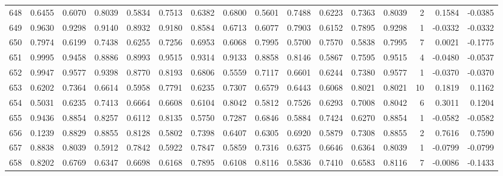\begin{tabular}{lrrrrrrrrrrrrrrr}
648 &      0.6455 &  0.6070 &  0.8039 &  0.5834 &  0.7513 &  0.6382 &  0.6800 &  0.5601 &  0.7488 &  0.6223 &   0.7363 &     0.8039 &      2 &                    0.1584 &                    -0.0385 \\
649 &      0.9630 &  0.9298 &  0.9140 &  0.8932 &  0.9180 &  0.8584 &  0.6713 &  0.6077 &  0.7903 &  0.6152 &   0.7895 &     0.9298 &      1 &                   -0.0332 &                    -0.0332 \\
650 &      0.7974 &  0.6199 &  0.7438 &  0.6255 &  0.7256 &  0.6953 &  0.6068 &  0.7995 &  0.5700 &  0.7570 &   0.5838 &     0.7995 &      7 &                    0.0021 &                    -0.1775 \\
651 &      0.9995 &  0.9458 &  0.8886 &  0.8993 &  0.9515 &  0.9314 &  0.9133 &  0.8858 &  0.8146 &  0.5867 &   0.7595 &     0.9515 &      4 &                   -0.0480 &                    -0.0537 \\
652 &      0.9947 &  0.9577 &  0.9398 &  0.8770 &  0.8193 &  0.6806 &  0.5559 &  0.7117 &  0.6601 &  0.6244 &   0.7380 &     0.9577 &      1 &                   -0.0370 &                    -0.0370 \\
653 &      0.6202 &  0.7364 &  0.6614 &  0.5958 &  0.7791 &  0.6235 &  0.7307 &  0.6579 &  0.6443 &  0.6068 &   0.8021 &     0.8021 &     10 &                    0.1819 &                     0.1162 \\
654 &      0.5031 &  0.6235 &  0.7413 &  0.6664 &  0.6608 &  0.6104 &  0.8042 &  0.5812 &  0.7526 &  0.6293 &   0.7008 &     0.8042 &      6 &                    0.3011 &                     0.1204 \\
655 &      0.9436 &  0.8854 &  0.8257 &  0.6112 &  0.8135 &  0.5750 &  0.7287 &  0.6846 &  0.5884 &  0.7424 &   0.6270 &     0.8854 &      1 &                   -0.0582 &                    -0.0582 \\
656 &      0.1239 &  0.8829 &  0.8855 &  0.8128 &  0.5802 &  0.7398 &  0.6407 &  0.6305 &  0.6920 &  0.5879 &   0.7308 &     0.8855 &      2 &                    0.7616 &                     0.7590 \\
657 &      0.8838 &  0.8039 &  0.5912 &  0.7842 &  0.5922 &  0.7847 &  0.5859 &  0.7316 &  0.6375 &  0.6646 &   0.6364 &     0.8039 &      1 &                   -0.0799 &                    -0.0799 \\
658 &      0.8202 &  0.6769 &  0.6347 &  0.6698 &  0.6168 &  0.7895 &  0.6108 &  0.8116 &  0.5836 &  0.7410 &   0.6583 &     0.8116 &      7 &                   -0.0086 &                    -0.1433 \\

\end{tabular}
